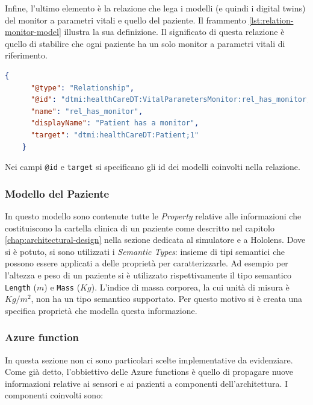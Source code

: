 Infine, l'ultimo elemento è la relazione che lega i modelli (e quindi i digital twins) del monitor a parametri vitali e quello del paziente.
Il frammento \ref{lst:relation-monitor-model} illustra la sua definizione. Il significato di questa relazione è quello di stabilire che ogni paziente ha un solo monitor a parametri vitali di riferimento.

\begin{lstlisting}[label={lst:relation-monitor-model}, caption={Relazione del modello del monitor e quello del paziente.}, language=json, firstnumber=1]
    {
      "@type": "Relationship",
      "@id": "dtmi:healthCareDT:VitalParametersMonitor:rel_has_monitor;1",
      "name": "rel_has_monitor",
      "displayName": "Patient has a monitor",
      "target": "dtmi:healthCareDT:Patient;1"
    }
\end{lstlisting}

Nei campi \texttt{@id} e \texttt{target} si specificano gli id dei modelli coinvolti nella relazione.

\subsubsection{Modello del Paziente}
In questo modello sono contenute tutte le \textit{Property} relative alle informazioni che costituiscono la cartella clinica di un paziente come descritto nel capitolo \ref{chap:architectural-design} nella sezione dedicata al simulatore e a Hololens. \newline \newline Dove si è potuto, si sono utilizzati i \textit{Semantic Types}: insieme di tipi semantici che possono essere applicati a delle proprietà per caratterizzarle. Ad esempio per l'altezza e peso di un paziente si è utilizzato rispettivamente il tipo semantico \texttt{Length} (\(m\)) e \texttt{Mass} (\(Kg\)). L'indice di massa corporea, la cui unità di misura è \(Kg/m^2\), non ha un tipo semantico supportato. Per questo motivo si è creata una specifica proprietà che modella questa informazione.

\subsubsection{Azure function}
In questa sezione non ci sono particolari scelte implementative da evidenziare. Come già detto, l'obbiettivo delle Azure functions è quello di propagare nuove informazioni relative ai sensori e ai pazienti a componenti dell'architettura. I componenti coinvolti sono: 


